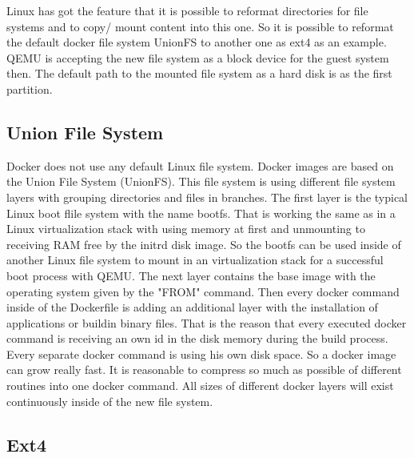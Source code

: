Linux has got the feature that it is possible to reformat directories for file systems and to copy/ mount content into this one. So it is possible to reformat the default docker file system UnionFS to another one as ext4 as an example. \\
QEMU is accepting the new file system as a block device for the guest system then. The default path to the mounted file system as a hard disk is  as the first partition\cite[~p.22]{White2020}.

\subsection{Union File System}

Docker does not use any default Linux file system. 
Docker images are based on the Union File System (UnionFS)\cite[~p.21]{Ashraf2015}. 
This file system is using different file system layers with grouping directories and files in branches. 
The first layer is the typical Linux boot flile system with the name bootfs. 
That is working the same as in a Linux virtualization stack with using memory at first and unmounting to receiving RAM free by the initrd disk image. 
So the bootfs can be used inside of another Linux file system to mount in an virtualization stack for a successful boot process with QEMU.
The next layer contains the base image with the operating system given by the "FROM" command.
Then every docker command inside of the Dockerfile is adding an additional layer with the installation of applications or buildin binary files.
That is the reason that every executed docker command is receiving an own id in the disk memory during the build process.
Every separate docker command is using his own disk space. So a docker image can grow really fast.
It is reasonable to compress so much as possible of different routines into one docker command. 
All sizes of different docker layers will exist continuously inside of the new file system.

\subsection{Ext4}

